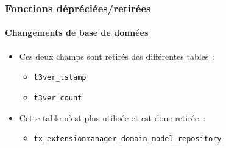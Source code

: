 %

\begin{frame}[fragile]
	\frametitle{Fonctions dépréciées/retirées}
	\framesubtitle{Changements de base de données}

	\begin{itemize}
		\item Ces deux champs sont retirés des différentes tables~:
			\begin{itemize}\small
				\item \texttt{t3ver\_tstamp}
				\item \texttt{t3ver\_count}
			\end{itemize}\normalsize
			\vspace{0.2cm}

		\item Cette table n'est plus utilisée et est donc retirée~:
			\begin{itemize}\small
				\item \texttt{tx\_extensionmanager\_domain\_model\_repository}
			\end{itemize}\normalsize
			\vspace{0.2cm}

	\end{itemize}

\end{frame}

